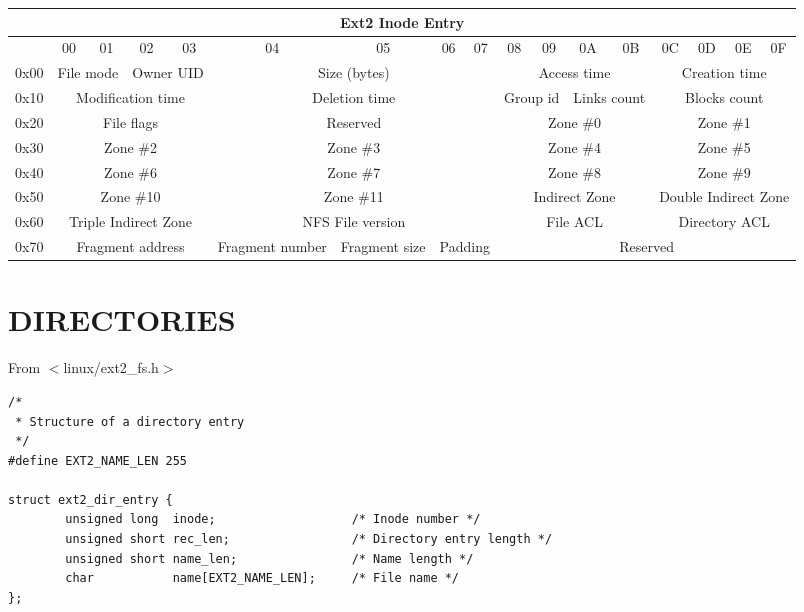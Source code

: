 \scriptsize
\begin{tabular}{|r||c|c|c|c|c|c|c|c||c|c|c|c|c|c|c|c|}
\hline
\multicolumn{17}{|c|}{Ext2 Inode Entry}
  \\ \hline\hline
 & 00 & 01 & 02 & 03 & 04 & 05 & 06 & 07 & 08 &
   09 & 0A & 0B & 0C & 0D & 0E & 0F \\ \hline
0x00 & \multicolumn{2}{c|}{File mode} &
   \multicolumn{2}{c|}{Owner UID} &
   \multicolumn{4}{c||}{Size (bytes)} &
   \multicolumn{4}{c|}{Access time} &
   \multicolumn{4}{c|}{Creation time} \\ \hline
0x10 & \multicolumn{4}{c|}{Modification time} &
   \multicolumn{4}{c||}{Deletion time} &
   \multicolumn{2}{c|}{Group id} &
   \multicolumn{2}{c|}{Links count} &
   \multicolumn{4}{c|}{Blocks count} \\ \hline
0x20 & \multicolumn{4}{c|}{File flags} &
   \multicolumn{4}{c||}{Reserved} &
   \multicolumn{4}{c|}{Zone \#0} &
   \multicolumn{4}{c|}{Zone \#1} \\ \hline
0x30 & \multicolumn{4}{c|}{Zone \#2} &
   \multicolumn{4}{c||}{Zone \#3} &
   \multicolumn{4}{c|}{Zone \#4} &
   \multicolumn{4}{c|}{Zone \#5} \\ \hline
0x40 & \multicolumn{4}{c|}{Zone \#6} &
   \multicolumn{4}{c||}{Zone \#7} &
   \multicolumn{4}{c|}{Zone \#8} &
   \multicolumn{4}{c|}{Zone \#9} \\ \hline
0x50 & \multicolumn{4}{c|}{Zone \#10} &
   \multicolumn{4}{c||}{Zone \#11} &
   \multicolumn{4}{c|}{Indirect Zone} &
   \multicolumn{4}{c|}{Double Indirect Zone} \\ \hline
0x60 & \multicolumn{4}{c|}{Triple Indirect Zone} &
   \multicolumn{4}{c||}{NFS File version} &
   \multicolumn{4}{c|}{File ACL} &
   \multicolumn{4}{c|}{Directory ACL} \\ \hline
0x70 & \multicolumn{4}{c|}{Fragment address} &
   \multicolumn{1}{c|}{Fragment number} &
   \multicolumn{1}{c|}{Fragment size} &
   \multicolumn{2}{c||}{Padding} &
   \multicolumn{8}{c|}{Reserved} \\ \hline
\end{tabular}
\normalsize

\section*{DIRECTORIES}

From $<$linux/ext2\_fs.h$>$

\begin{verbatim}
/*
 * Structure of a directory entry
 */
#define EXT2_NAME_LEN 255

struct ext2_dir_entry {
        unsigned long  inode;                   /* Inode number */
        unsigned short rec_len;                 /* Directory entry length */
        unsigned short name_len;                /* Name length */
        char           name[EXT2_NAME_LEN];     /* File name */
};
\end{verbatim}

